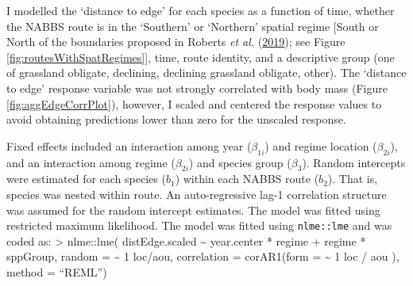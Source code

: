\documentclass[print]{nuthesis}
\begin{document}
I modelled the `distance to edge' for each species as a function of time, whether the NABBS route is in the `Southern' or `Northern' spatial regime {[}South or North of the boundaries proposed in Roberts \emph{et al.} (\protect\hyperlink{ref-roberts2019shifting}{2019}); see Figure \ref{fig:routesWithSpatRegimes}{]}, time, route identity, and a descriptive group (one of grassland obligate, declining, declining grassland obligate, other). The `distance to edge' response variable was not strongly correlated with body mass (Figure \ref{fig:aggEdgeCorrPlot}), however, I scaled and centered the response values to avoid obtaining predictions lower than zero for the unscaled response.

Fixed effects included an interaction among year (\(\beta_{1i}\)) and regime location (\(\beta_{2i}\)), and an interaction among regime (\(\beta_{2i}\)) and species group (\(\beta_{3}\)). Random intercepts were estimated for each species (\(b_1\)) within each NABBS route (\(b_2\)). That is, species was nested within route. An auto-regressive lag-1 correlation structure was assumed for the random intercept estimates. The model was fitted using restricted maximum likelihood. The model was fitted using \texttt{nlme::lme} and was coded as:
\textgreater{} nlme::lme( distEdge.scaled \textasciitilde{} year.center * regime + regime * sppGroup,
random = \textasciitilde{} 1 \textbar{} loc/aou, correlation = corAR1(form = \textasciitilde{} 1 \textbar{} loc / aou ), method = ``REML'')
\end{document}
